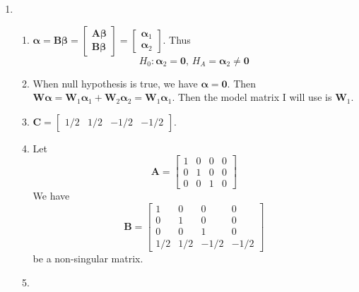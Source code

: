 \documentclass{article}
\begin{document}
\begin{enumerate}[leftmargin = 0 em, label = \arabic*., font = \bfseries]
	\item
	      \begin{enumerate}
		      \item
		            $\bm \alpha = \bm B \bm \beta = \begin{bmatrix}
				            \bm A \bm \beta \\
				            \bm B \bm \beta
			            \end{bmatrix} = \begin{bmatrix}
				            \bm \alpha_1 \\
				            \bm \alpha_2
			            \end{bmatrix}$. Thus
		            \[H_0 : \bm \alpha_2 = \bm 0,\, H_{A} = \bm \alpha_2 \neq \bm 0\]

		      \item
		            When null hypothesis is true, we have $\bm \alpha = \bm 0$. Then $\bm W \bm \alpha = \bm W _1 \bm \alpha_1 + \bm W_2 \bm \alpha_2 = \bm W_1 \bm \alpha_1$. Then the model matrix I will use is $\bm W_1$.

		      \item
		            $\bm C = \begin{bmatrix}
				            1/2 & 1/2 & -1/2 & -1/2
			            \end{bmatrix}$.

		      \item
		            Let
		            \[\bm A = \begin{bmatrix}
				            1 & 0 & 0 & 0 \\
				            0 & 1 & 0 & 0 \\
				            0 & 0 & 1 & 0
			            \end{bmatrix}\]
		            We have
		            \[\bm B = \begin{bmatrix}
				            1   & 0   & 0    & 0    \\
				            0   & 1   & 0    & 0    \\
				            0   & 0   & 1    & 0    \\
				            1/2 & 1/2 & -1/2 & -1/2
			            \end{bmatrix}\]
		            be a non-singular matrix.

		      \item


\end{enumerate}
\end{enumerate}
\end{document}
